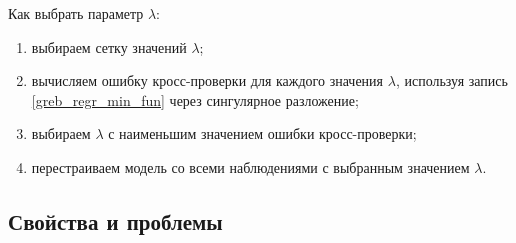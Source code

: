 \documentclass[specialist,
               subf,href,colorlinks=true, 12pt,a4paper]{article} %
\numberwithin{equation}{section}
\begin{document}
Как выбрать параметр $\lambda$:
\begin{enumerate}
\item выбираем сетку значений $\lambda$;
\item вычисляем ошибку кросс-проверки для каждого значения $\lambda$, используя запись \eqref{greb_regr_min_fun} через сингулярное разложение;
\item выбираем $\lambda$ с наименьшим значением ошибки кросс-проверки;
\item перестраиваем модель со всеми наблюдениями с выбранным значением $\lambda$.
\end{enumerate}


\subsection{Свойства и проблемы}
\end{document}
